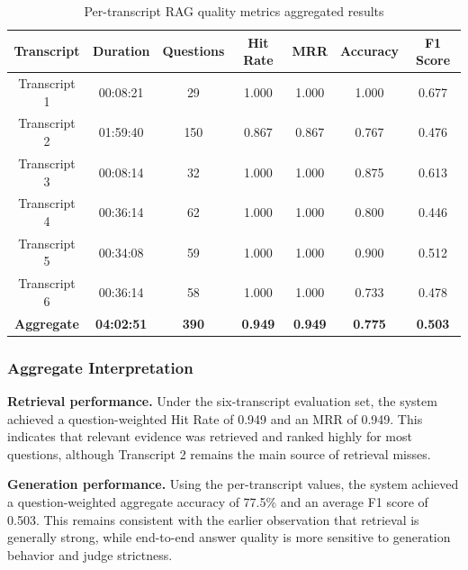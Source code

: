 \begin{table}[H]
  \centering
  \begingroup
  \small
  \setlength{\tabcolsep}{4pt}
  \begin{tabular}{|c|c|c|c|c|c|c|}
    \hline
    \textbf{Transcript} & \textbf{Duration} & \textbf{Questions} & \textbf{Hit Rate} & \textbf{MRR} & \textbf{Accuracy} & \textbf{F1 Score} \\
    \hline
    Transcript 1 & 00:08:21 & 29 & 1.000 & 1.000 & 1.000 & 0.677 \\
    \hline
    Transcript 2 & 01:59:40 & 150 & 0.867 & 0.867 & 0.767 & 0.476 \\
    \hline
    Transcript 3 & 00:08:14 & 32 & 1.000 & 1.000 & 0.875 & 0.613 \\
    \hline
    Transcript 4 & 00:36:14 & 62 & 1.000 & 1.000 & 0.800 & 0.446 \\
    \hline
    Transcript 5 & 00:34:08 & 59 & 1.000 & 1.000 & 0.900 & 0.512 \\
    \hline
    Transcript 6 & 00:36:14 & 58 & 1.000 & 1.000 & 0.733 & 0.478 \\
    \hline
    \textbf{Aggregate} & \textbf{04:02:51} & \textbf{390} & \textbf{0.949} & \textbf{0.949} & \textbf{0.775} & \textbf{0.503} \\
    \hline
  \end{tabular}
  \endgroup
  \caption{Per-transcript RAG quality metrics aggregated results}
  \label{tab:rag-quality-metrics}
\end{table}

\subsubsection*{Aggregate Interpretation}
\textbf{Retrieval performance.} Under the six-transcript evaluation set, the system achieved a question-weighted Hit Rate of 0.949 and an MRR of 0.949. This indicates that relevant evidence was retrieved and ranked highly for most questions, although Transcript 2 remains the main source of retrieval misses.

\textbf{Generation performance.} Using the per-transcript values, the system achieved a question-weighted aggregate accuracy of 77.5\% and an average F1 score of 0.503. This remains consistent with the earlier observation that retrieval is generally strong, while end-to-end answer quality is more sensitive to generation behavior and judge strictness.


